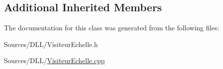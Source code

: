 \subsection*{Additional Inherited Members}


The documentation for this class was generated from the following files\+:\begin{DoxyCompactItemize}
\item 
Sources/\+D\+L\+L/Visiteur\+Echelle.\+h\item 
Sources/\+D\+L\+L/\hyperlink{_visiteur_echelle_8cpp}{Visiteur\+Echelle.\+cpp}\end{DoxyCompactItemize}
